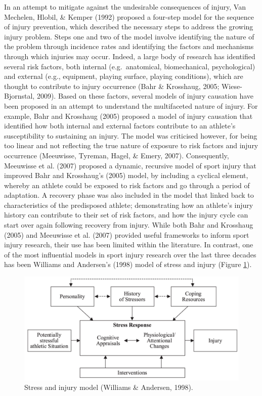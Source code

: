 \documentclass[man,floatsintext]{apa6}
\begin{document}
In an attempt to mitigate against the undesirable consequences of injury, Van Mechelen, Hlobil, \& Kemper (1992) proposed a four-step model for the sequence of injury prevention, which described the necessary steps to address the growing injury problem.
Steps one and two of the model involve identifying the nature of the problem through incidence rates and identifying the factors and mechanisms through which injuries may occur.
Indeed, a large body of research has identified several risk factors, both internal (e.g.~anatomical, biomechanical, psychological) and external (e.g., equipment, playing surface, playing conditions), which are thought to contribute to injury occurrence (Bahr \& Krosshaug, 2005; Wiese-Bjornstal, 2009).
Based on these factors, several models of injury causation have been proposed in an attempt to understand the multifaceted nature of injury.
For example, Bahr and Krosshaug (2005) proposed a model of injury causation that identified how both internal and external factors contribute to an athlete's susceptibility to sustaining an injury.
The model was criticised however, for being too linear and not reflecting the true nature of exposure to risk factors and injury occurrence (Meeuwisse, Tyreman, Hagel, \& Emery, 2007).
Consequently, Meeuwisse et al. (2007) proposed a dynamic, recursive model of sport injury that improved Bahr and Krosshaug's (2005) model, by including a cyclical element, whereby an athlete could be exposed to risk factors and go through a period of adaptation.
A recovery phase was also included in the model that linked back to characteristics of the predisposed athlete; demonstrating how an athlete's injury history can contribute to their set of risk factors, and how the injury cycle can start over again following recovery from injury.
While both Bahr and Krosshaug (2005) and Meeuwisse et al. (2007) provided useful frameworks to inform sport injury research, their use has been limited within the literature.
In contrast, one of the most influential models in sport injury research over the last three decades has been Williams and Andersen's (1998) model of stress and injury (Figure \ref{fig:wamodel}).

\begin{figure}[H]

{\centering \includegraphics[width=5.67in]{figs/lit/wamodel} 

}

\caption{Stress and injury model (Williams \& Andersen, 1998).}\label{fig:wamodel}
\end{figure}
\end{document}
